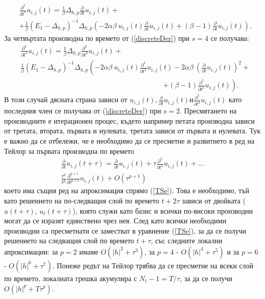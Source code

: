 \documentclass{article}
\newcommand{\rf}[1]{(\ref{#1})}
\theoremstyle{remark}
\begin{document}
\begin{align} \label{der3}
 &\frac{\partial^3}{\partial t^3}u_{i,j}(t) = \frac{1}{\beta}\Delta_{h,p} \frac{\partial}{\partial t}u_{i, j}(t) + \nonumber\\
&+ \frac{1}{\beta} (E_1-\Delta_{h,p})^{-1}\Delta_{h,p} \left( -2 \alpha \beta \: u_{i, j}(t) \frac{\partial}{\partial t}u_{i, j}(t) +  (\beta-1) \frac{\partial}{\partial t} u_{i, j}(t) \right).
\end{align}
За четвъртата производна по времето от \rf{discreteDer} при $s=4$ се получава:
\begin{align} \label{der4}
&\frac{\partial^4}{\partial t^4}u_{i,j}(t) = \frac{1}{\beta}\Delta_{h,p} \frac{\partial^2}{\partial t^2}u_{i, j}(t) +   \nonumber\\
& \frac{1}{\beta}(E_1-\Delta_{h,p})^{-1}\Delta_{h,p} \left( -2 \alpha \beta \:  u_{i, j}(t)\frac{\partial^2}{\partial t^2}u_{i, j}(t) -2 \alpha \beta \: \left( \frac{\partial}{\partial t}u_{i, j}(t) \right)^2 + \right. \nonumber\\
&\quad \quad \quad \quad \quad \quad \quad \quad \quad \quad \quad \quad \quad \quad \quad \quad \quad \quad \quad \quad \left. +  (\beta-1) \frac{\partial^2}{\partial t^2} u_{i, j}(t) \right) .
\end{align}
В този случай дясната страна зависи от $u_{i, j}(t), \frac{\partial}{\partial t}u_{i, j}(t) и \frac{\partial^2}{\partial t^2}u_{i, j}(t)$ като последния член се получава от \rf{discreteDer} при $s=2$. Пресмятането на производните е итерационен процес, където например петата производна зависи от третата, втората, първата и нулевата, третата зависи от първата и нулевата. Тук е важно да се отбележи, че е необходимо да се пресметне и развитието в ред на Тейлор за първата производна по времето
\begin{align} \label{TSeDer}
\frac{ \partial}{ \partial t }u_{i,j}(t+\tau) = \frac{ \partial }{ \partial t }u_{i,j}(t) + \tau \frac{ \partial^2 }{ \partial t^2 }u_{i,j}(t)  + ... 
\nonumber\\
\frac{ \tau^p }{ p! } \frac{ \partial^{p+1}}{ \partial t^{p+1} }u_{i,j}(t) + O(\tau^{p+1})
\end{align}
което има същия ред на апроксимация спрямо \rf{TSe}. Това е необходимо, тъй като решението на по-следващия слой по времето $t+2\tau$ зависи от двойката ($u(t+\tau)$, $u_t(t+\tau)$), която служи като базис и всички по-високи производни могат да се изразят единствено чрез нея. След като всички необходими производни са пресметнати се заместват в уравнение \rf{TSe}, за да се получи решението на следващия слой по времето $t+\tau$, със следните локални апроксимации: за $p=2$ имаме $O(|h|^2 + \tau^3)$, за $p=4$ - $O(|h|^4 + \tau^5)$ и за $p=6$ - $O(|h|^6 + \tau^7)$. Понеже редът на Тейлор трябва да се пресметне на всеки слой по времето, локалната грешка акумулира с $N_t - 1 = T/\tau$, за да се получи $O(|h|^p + T \tau^p)$.
\end{document}
